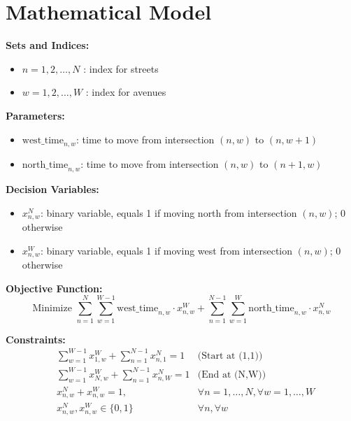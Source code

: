 \documentclass{article}
\begin{document}
\section*{Mathematical Model}

\textbf{Sets and Indices:}
\begin{itemize}
    \item $n = 1, 2, \ldots, N$ : index for streets
    \item $w = 1, 2, \ldots, W$ : index for avenues
\end{itemize}

\textbf{Parameters:}
\begin{itemize}
    \item $\text{west\_time}_{n,w}$: time to move from intersection $(n, w)$ to $(n, w+1)$
    \item $\text{north\_time}_{n,w}$: time to move from intersection $(n, w)$ to $(n+1, w)$
\end{itemize}

\textbf{Decision Variables:}
\begin{itemize}
    \item $x_{n,w}^N$: binary variable, equals 1 if moving north from intersection $(n, w)$; 0 otherwise
    \item $x_{n,w}^W$: binary variable, equals 1 if moving west from intersection $(n, w)$; 0 otherwise
\end{itemize}

\textbf{Objective Function:}
\[
\text{Minimize } \sum_{n=1}^{N}\sum_{w=1}^{W-1} \text{west\_time}_{n,w} \cdot x_{n,w}^W + \sum_{n=1}^{N-1}\sum_{w=1}^{W} \text{north\_time}_{n,w} \cdot x_{n,w}^N
\]

\textbf{Constraints:}
\begin{align*}
& \sum_{w=1}^{W-1} x_{1,w}^W + \sum_{n=1}^{N-1} x_{n,1}^N = 1 & \text{(Start at (1,1))} \\
& \sum_{w=1}^{W-1} x_{N,w}^W + \sum_{n=1}^{N-1} x_{n,W}^N = 1 & \text{(End at (N,W))} \\
& x_{n,w}^N + x_{n,w}^W = 1, & \forall n = 1, \dots, N, \forall w = 1, \dots, W \\
& x_{n,w}^N, x_{n,w}^W \in \{0, 1\} & \forall n, \forall w
\end{align*}
\end{document}
